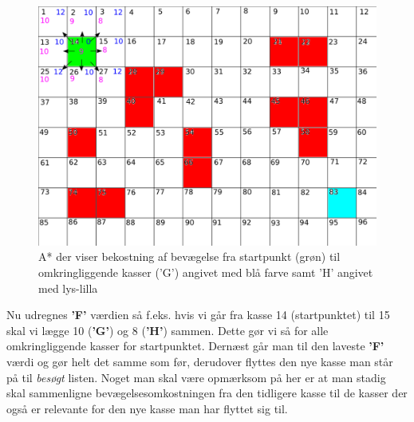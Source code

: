 \begin{figure}[ht!]
\begin{center}
\includegraphics[width=1.00\textwidth]{Pictures/Teoriafsnit/Figurfiler/Grid3.png}
\end{center}
\label{fig:AKvadrat2}
\caption{A* der viser bekostning af bevægelse fra startpunkt (grøn) til omkringliggende kasser ('G') angivet med blå farve samt 'H' angivet med lys-lilla}
\end{figure}

Nu udregnes \textbf{'F'} værdien så f.eks. hvis vi går fra kasse 14 (startpunktet) til 15 skal vi lægge 10 (\textbf{'G'}) og 8 (\textbf{'H'}) sammen. Dette gør vi så for alle omkringliggende kasser for startpunktet. Dernæst går man til den laveste \textbf{'F'} værdi og gør helt det samme som før, derudover flyttes den nye kasse man står på til \textit{besøgt} listen. Noget man skal være opmærksom på her er at man stadig skal sammenligne bevægelsesomkostningen fra den tidligere kasse til de kasser der også er relevante for den nye kasse man har flyttet sig til. 